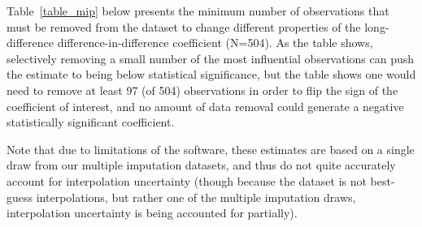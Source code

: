 \documentclass[12pt]{article}
\begin{document}
Table~\ref{table_mip} below presents the minimum number of observations that must be removed from the dataset to change different properties of the long-difference difference-in-difference coefficient (N=504). As the table shows, selectively removing a small number of the most influential observations can push the estimate to being below statistical significance, but the table shows one would need to remove at least 97 (of 504) observations in order to flip the sign of the coefficient of interest, and no amount of data removal could generate a negative statistically significant coefficient.

Note that due to limitations of the \cite{broderick2021} software, these estimates are based on a single draw from our multiple imputation datasets, and thus do not quite accurately account for interpolation uncertainty (though because the dataset is not best-guess interpolations, but rather one of the multiple imputation draws, interpolation uncertainty is being accounted for partially).









\clearpage
\newpage
\singlespacing
{}




\end{document}

